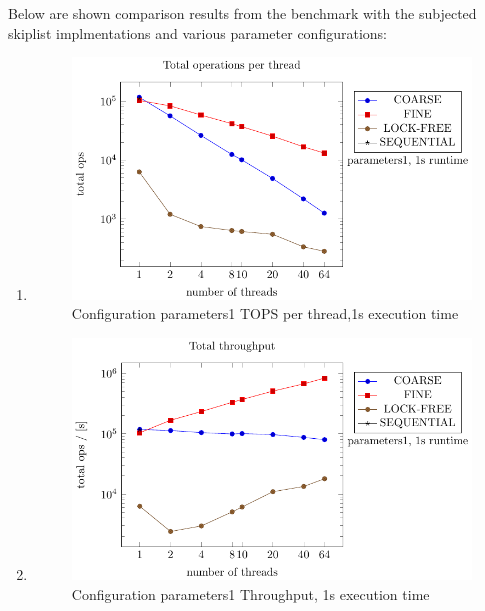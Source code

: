 \documentclass{article}
\begin{document}
Below are shown comparison results from the benchmark with the subjected skiplist implmentations and various parameter configurations:
\begin{enumerate}
    \item 
    \begin{figure}[H]
        \centering
        \includegraphics{../plots/parameters1_1s_per_thread.pdf}
        \caption{Configuration parameters1 TOPS per thread,1s execution time}
       
        \label{fig:parameters1_1s_per_thread}
    \end{figure}


    \item 
    \begin{figure}[H]
        \centering
        \includegraphics{../plots/parameters1_1s_throughput.pdf}
        \caption{Configuration parameters1 Throughput, 1s execution time}
        \label{fig:parameters1_1s_throughput}
    \end{figure}


\end{enumerate}
\end{document}
